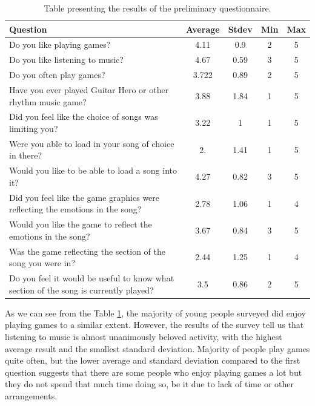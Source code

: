 \begin{table}
\begin{center}
\begin{tabular}{| p{8cm} | c | c | c | c | } 																								      \hline 
\textbf{Question} & \textbf{Average} & \textbf{Stdev} & \textbf{Min} & \textbf{Max} 						   \\ \hline \hline
Do you like playing games? & 4.11 & 0.9 & 2 & 5		 					 					 									\\ \hline 
Do you like listening to music? & 4.67 & 0.59 & 3 & 5		 					 					 								\\ \hline 
Do you often play games? & 3.722 & 0.89 & 2 & 5 		 					 					 								\\ \hline 
Have you ever played Guitar Hero or other rhythm music game? & 3.88 & 1.84  & 1 & 5							\\ \hline 
Did you feel like the choice of songs was limiting you? & 3.22 & 1 & 1 & 5 					 							\\ \hline 
Were you able to load in your song of choice in there? & 2. & 1.41 & 1 & 5 					 							\\ \hline 
Would you like to be able to load a song into it? & 4.27 & 0.82 & 3 & 5 				 									\\ \hline 
Did you feel like the game graphics were reflecting the emotions in the song? & 2.78 & 1.06 & 1 & 4 			\\ \hline 
Would you like the game to reflect the emotions in the song? & 3.67 & 0.84 & 3 & 5 	 								\\ \hline 
Was the game reflecting the section of the song you were in? & 2.44 & 1.25 & 1 & 4  								\\ \hline 
Do you feel it would be useful to know what section of the song is currently played? & 3.5 & 0.86 & 2 & 5  	\\ \hline 
\end{tabular}
\caption{Table presenting the results of the preliminary questionnaire.}
\label{table:preliminaryquestions}
\end{center}
\end{table}

As we can see from the Table \ref{table:preliminaryquestions}, the majority of young people surveyed did enjoy playing games to a similar extent. However, the results of the survey tell us that listening to music is almost unanimously beloved activity, with the highest average result and the smallest standard deviation. 
Majority of people play games quite often, but the lower average and standard deviation compared to the first question suggests that there are some people who enjoy playing games a lot but they do not spend that much time doing so, be it due to lack of time or other arrangements. 


